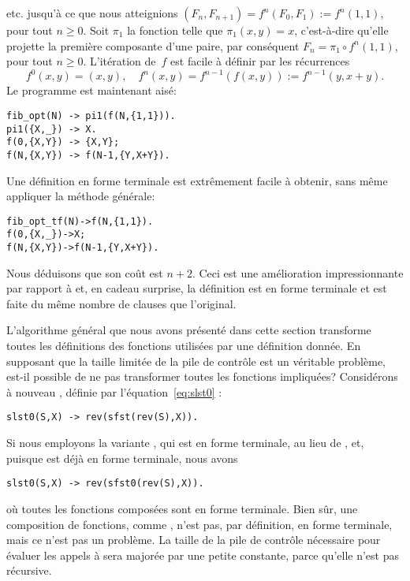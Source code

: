 etc. jusqu'à ce que nous atteignions \((F_{n},F_{n+1}) = f^n(F_0,F_1)
:= f^{n}(1,1)\), pour tout \(n \geqslant 0\). Soit \(\pi_1\) la
fonction telle que \(\pi_1(x,y) = x\), c'est-à-dire qu'elle projette
la première composante d'une paire, par conséquent \(F_n = \pi_1 \circ
f^n(1,1)\), pour tout \(n \geqslant 0\). L'itération de~\(f\) est
facile à définir par les récurrences
\begin{equation*}
f^0(x,y) = (x,y),\quad
f^n(x,y) = f^{n-1}(f(x,y)) := f^{n-1}(y,x+y).
\end{equation*}
Le programme \Erlang est maintenant aisé:
\begin{verbatim}
fib_opt(N) -> pi1(f(N,{1,1})).
pi1({X,_}) -> X.
f(0,{X,Y}) -> {X,Y};
f(N,{X,Y}) -> f(N-1,{Y,X+Y}).
\end{verbatim}
Une définition en forme terminale est extrêmement facile à obtenir,
sans même appliquer la méthode générale:
\begin{alltt}
fib\_opt\_tf(N) -> f(N,\{1,1\}).
f(0,\{X,\_\})    -> X;\hfill% \emph{Projection ici}
f(N,\{X,Y\})    -> f(N-1,\{Y,X+Y\}).
\end{alltt}
Nous déduisons que son coût est \(n + 2\). Ceci est une amélioration
impressionnante par rapport à  et, en cadeau surprise,
la définition est en forme terminale et est faite du même nombre de
clauses que l'original.

L'algorithme général que nous avons présenté dans cette section
transforme toutes les définitions des fonctions utilisées par une
définition donnée. En supposant que la taille limitée de la pile de
contrôle est un véritable problème, est-il possible de ne pas
transformer toutes les fonctions impliquées? Considérons à nouveau
, définie par l'équation~\eqref{eq:slst0}
:
\begin{verbatim}
slst0(S,X) -> rev(sfst(rev(S),X)).
\end{verbatim}
Si nous employons la variante , qui est en forme
terminale, au lieu de , et, puisque 
est déjà en forme terminale, nous avons
\begin{verbatim}
slst0(S,X) -> rev(sfst0(rev(S),X)).
\end{verbatim}
où toutes les fonctions composées sont en forme terminale. Bien sûr,
une composition de fonctions, comme , n'est pas, par
définition, en forme terminale, mais ce n'est pas un problème. La
taille de la pile de contrôle nécessaire pour évaluer les appels à
 sera majorée par une petite constante, parce qu'elle
n'est pas récursive.


